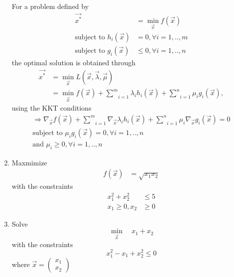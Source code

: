 \documentclass[journal,12pt,twocolumn]{IEEEtran}
\renewcommand\thesection{\arabic{section}}
\begin{document}
\begin{enumerate}[label=\thesection.\arabic*,ref=\thesection.\theenumi]
\solution For a problem defined by 
\begin{align}
\vec{x^*} &= \min_{\vec{x}}f(\vec{x})
\\
\text{subject to } h_i(\vec{x}) &= 0, \forall i=1,..,m
\\
\text{subject to } g_i(\vec{x}) &\le 0, \forall i=1,..,n
\end{align}
%
the optimal solution is obtained through
%
\begin{align}
\vec{x^*} &= \min_{\vec{x}}L(\vec{x}, \vec{\lambda}, \vec{\mu}) 
\\
&= \min_{\vec{x}}f(\vec{x})  + \underset{i=1}{\overset{m}{\sum}} \lambda_i h_i(\vec{x}) + \underset{i=1}{\overset{n}{\sum}} \mu_i g_i(\vec{x}),
\end{align}
%
using the KKT conditions
%
\begin{align}
\Rightarrow \nabla_\vec{x} f(\vec{x})  + \underset{i=1}{\overset{m}{\sum}} \nabla_\vec{x} \lambda_i h_i(\vec{x}) + \underset{i=1}{\overset{n}{\sum}} \mu_i \nabla_\vec{x} g_i(\vec{x}) = 0 
\\
\text{subject to }\mu_i g_i(\vec{x}) = 0, \forall i = 1,..,n
\\
\text{and }\mu_i \ge 0, \forall i = 1,..,n
\end{align}
%
\item
	Maxmimize 
	\begin{align}
	f(\vec{x}) &= \sqrt{x_1x_2}
	\end{align}
	with the constraints
	\begin{align}
	x_1^2+x_2^2 &\leq 5 \\
	x_1 \geq 0, x_2 &\geq 0
	\end{align}

%
\item
	\label{convex_sdp_eqiv}
	Solve
	\begin{equation}
	\min_{\vec{x}} \quad x_1 + x_2
	\end{equation}
	with the constraints
	\begin{equation}
	x_1^2 - x_1 + x_2^2 \leq 0
	\end{equation}
where 
$
\vec{x} = \begin{pmatrix}
x_1 \\
x_2
\end{pmatrix}
$


\end{enumerate}
\end{document}
